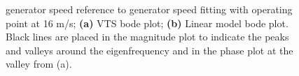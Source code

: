 \begin{figure}[ht]
	\centering
	
	\hfil
	
	\caption{generator speed reference to generator speed fitting with operating point at 16 m/s; \textbf{(a)} VTS bode plot; \textbf{(b)} Linear model bode plot. Black lines are placed in the magnitude plot to indicate the peaks and valleys around the eigenfrequency and in the phase plot at the valley from (a).}
	\label{fig:app_wref-w_16}
\end{figure}



